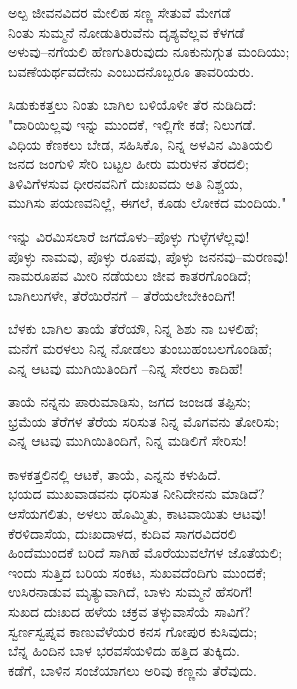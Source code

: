 \begin{myquote}
ಅಲ್ಪ ಜೀವನವಿದರ ಮೇಲಿಹ ಸಣ್ಣ ಸೇತುವೆ ಮೇಗಡೆ\\ನಿಂತು ಸುಮ್ಮನೆ ನೋಡುತಿರುವೆನು ದೃಶ್ಯವೆಲ್ಲವ ಕೆಳಗಡೆ\\ಅಳುವು–ನಗೆಯಲಿ ಹೆಣಗುತಿರುವುದು ನೂಕುನುಗ್ಗುತ ಮಂದಿಯು;\\ಬವಣೆಯರ್ಥವದೇನು ಎಂಬುದನೊಬ್ಬರೂ ತಾವರಿಯರು.
\end{myquote}

\begin{myquote}
ಸಿಡುಕುಕತ್ತಲು ನಿಂತು ಬಾಗಿಲ ಬಳಿಯೊಳೀ ತೆರ ನುಡಿದಿದೆ:\\"ದಾರಿಯಿಲ್ಲವು ಇನ್ನು ಮುಂದಕೆ, ಇಲ್ಲಿಗೇ ಕಡೆ; ನಿಲುಗಡೆ.\\ವಿಧಿಯ ಕೆಣಕಲು ಬೇಡ, ಸಹಿಸಿಕೊ, ನಿನ್ನ ಅಳವಿನ ಮಿತಿಯಲಿ\\ಜನದ ಜಂಗುಳಿ ಸೇರಿ ಬಟ್ಟಲ ಹೀರು ಮರುಳನ ತೆರದಲಿ;\\ತಿಳಿವಿಗೆಳಸುವ ಧೀರನವನಿಗೆ ದುಃಖವದು ಅತಿ ನಿಶ್ಚಯ,\\ಮುಗಿಸು ಪಯಣವನಿಲ್ಲೆ, ಈಗಲೆ, ಕೂಡು ಲೋಕದ ಮಂದಿಯ."
\end{myquote}

\begin{myquote}
ಇನ್ನು ವಿರಮಿಸಲಾರೆ ಜಗದೊಳು–ಪೊಳ್ಳು ಗುಳ್ಳೆಗಳೆಲ್ಲವು!\\ಪೊಳ್ಳು ನಾಮವು, ಪೊಳ್ಳು ರೂಪವು, ಪೊಳ್ಳು ಜನನವು–ಮರಣವು!\\ನಾಮರೂಪವ ಮೀರಿ ನಡೆಯಲು ಜೀವ ಕಾತರಗೊಂಡಿದೆ;\\ಬಾಗಿಲುಗಳೇ, ತೆರೆಯಿರೆನಗೆ – ತೆರೆಯಲೇಬೇಕಿಂದಿಗೆ!
\end{myquote}

\begin{myquote}
ಬೆಳಕು ಬಾಗಿಲ ತಾಯೆ ತೆರೆಯೌ, ನಿನ್ನ ಶಿಶು ನಾ ಬಳಲಿಹೆ;\\ಮನೆಗೆ ಮರಳಲು ನಿನ್ನ ನೋಡಲು ತುಂಬುಹಂಬಲಗೊಂಡಿಹೆ;\\ಎನ್ನ ಆಟವು ಮುಗಿಯಿತಿಂದಿಗೆ –ನಿನ್ನ ಸೇರಲು ಕಾದಿಹೆ!
\end{myquote}

\begin{myquote}
ತಾಯೆ ನನ್ನನು ಪಾರುಮಾಡಿಸು, ಜಗದ ಜಂಜಡ ತಪ್ಪಿಸು;\\ಭ್ರಮೆಯ ತೆರೆಗಳ ತೆರೆಯ ಸರಿಸುತ ನಿನ್ನ ಮೊಗವನು ತೋರಿಸು;\\ಎನ್ನ ಆಟವು ಮುಗಿಯಿತಿಂದಿಗೆ, ನಿನ್ನ ಮಡಿಲಿಗೆ ಸೇರಿಸು!
\end{myquote}

\begin{myquote}
ಕಾಳಕತ್ತಲಿನಲ್ಲಿ ಆಟಕೆ, ತಾಯೆ, ಎನ್ನನು ಕಳುಹಿದೆ.\\ಭಯದ ಮುಖವಾಡವನು ಧರಿಸುತ ನೀನಿದೇನನು ಮಾಡಿದೆ?\\ಆಸೆಯಗಲಿತು, ಅಳಲು ಹೊಮ್ಮಿತು, ಕಾಟವಾಯಿತು ಆಟವು!\\ಕೆರಳಿದಾಸೆಯ, ದುಃಖದಾಳದ, ಕುದಿವ ಸಾಗರವಿದರಲಿ\\ಹಿಂದೆಮುಂದಕೆ ಬರಿದೆ ಸಾಗಿಹೆ ಮೊರೆಯುವಲೆಗಳ ಜೊತೆಯಲಿ;\\ಇಂದು ಸುತ್ತಿದ ಬರಿಯ ಸಂಕಟ, ಸುಖವದೆಂದಿಗು ಮುಂದಕೆ;\\ಉಸಿರನಾಡುವ ಮೃತ್ಯುವಾಗಿದೆ, ಬಾಳು ಸುಮ್ಮನೆ ಹೆಸರಿಗೆ!\\ಸುಖದ ದುಃಖದ ಹಳೆಯ ಚಕ್ರವ ತಳ್ಳುವಾಸೆಯೆ ಸಾವಿಗೆ?\\ಸ್ವರ್ಣಸ್ವಪ್ನವ ಕಾಣುವೆಳೆಯರ ಕನಸ ಗೋಪುರ ಕುಸಿವುದು;\\ಬೆನ್ನ ಹಿಂದಿನ ಬಾಳ ಭರವಸೆಯಳಿದು ಹತ್ತಿದ ತುಕ್ಕಿದು.\\ಕಡೆಗೆ, ಬಾಳಿನ ಸಂಜೆಯಾಗಲು ಅರಿವು ಕಣ್ಣನು ತೆರೆವುದು.
\end{myquote}

